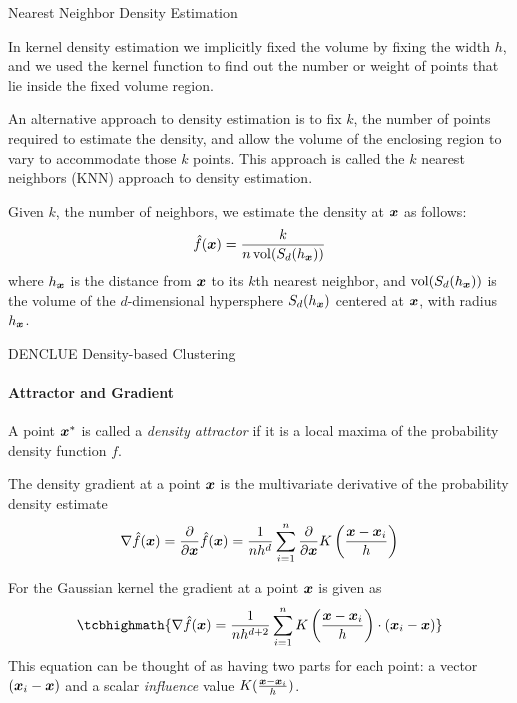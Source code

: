 \begin{frame}{Nearest Neighbor Density Estimation}

  In kernel density estimation we implicitly f\/{i}xed the
volume by f\/{i}xing the width $h$, and we used the
kernel function to f\/{i}nd out the number or weight of points that lie
inside the f\/{i}xed volume region. 

\medskip
An alternative approach to density
estimation is to f\/{i}x $k$, the number of points required to estimate the
density, and allow the volume of the enclosing region to vary to
accommodate those $k$ points. This
approach is called the $k$ nearest neighbors (KNN) approach to density
estimation. 

\medskip
Given $k$, the number of neighbors, we estimate the
density at ${\boldsymbol x}$ as follows:
\begin{align*}
  \hf(\bx) = \frac{k}{n \vol(S_d(h_\bx))}
\end{align*}
where $h_{\boldsymbol x}$ is the distance from ${\boldsymbol x}$ to its $k$th nearest
neighbor, and
$\vol(S_d(h_\bx))$ is the volume of the
$d$-dimensional hypersphere $S_d(h_{\boldsymbol x})$ centered at ${\boldsymbol x}$,
with radius $h_{\boldsymbol x}$.
\end{frame}


\ifdefined\wox \begin{frame} \titlepage \end{frame} \fi

\begin{frame}{DENCLUE Density-based Clustering}
\framesubtitle{Attractor and Gradient}
A point ${\boldsymbol x}^*$ is called a {\em density attractor} if it is a
local maxima of the probability density function $f$.  

\medskip
The density gradient at a point ${\boldsymbol x}$ is the multivariate
derivative of the probability density estimate
\begin{align*}
    \nabla \kern3pt\hat{\kern-3pt f}({\boldsymbol x}) = {\partial \over \partial {\boldsymbol x}} \kern3pt\hat{\kern-3pt f}({\boldsymbol x}) =
     {1 \over n h^d}
     \sum_{i=1}^n {\partial \over \partial {\boldsymbol x}}
     K\left(\frac{{\boldsymbol x}-{\boldsymbol x}_i}{h}\right)
\end{align*}

\medskip
For the Gaussian kernel the gradient at a point ${\boldsymbol x}$ is given as
 \begin{align*}
\tcbhighmath{
     \grad \hf(\bx)  = {1 \over n h^{d+2}} \sum_{i=1}^n
        K\left(\frac{\bx-\bx_i}{h}\right)\cdot (\bx_i - \bx)
}
\end{align*}
This equation can be thought of as having two parts for each point: a
vector $({\boldsymbol x}_i-{\boldsymbol x})$ and a scalar {\em influence} value
$K(\frac{{\boldsymbol x}-{\boldsymbol x}_i}{h})$.
\end{frame}



